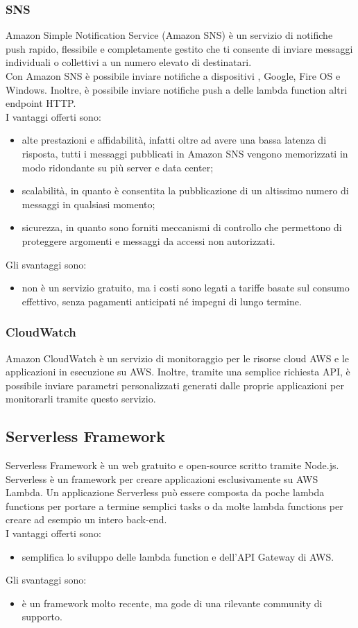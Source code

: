 \subsubsection{SNS}
Amazon Simple Notification Service (Amazon SNS) è un servizio di notifiche push rapido, flessibile e completamente gestito che ti consente di inviare messaggi individuali o collettivi a un numero elevato di destinatari. \\
Con Amazon SNS è possibile inviare notifiche a dispositivi , Google, Fire OS e Windows. Inoltre, è possibile inviare notifiche push a delle lambda function  altri endpoint HTTP. \\
I vantaggi offerti sono:
\begin{itemize}
	\item alte prestazioni e affidabilità, infatti oltre ad avere una bassa latenza di risposta, tutti i messaggi pubblicati in Amazon SNS vengono memorizzati in modo ridondante su più server e data center;
	\item scalabilità, in quanto è consentita la pubblicazione di un altissimo numero di messaggi in qualsiasi momento;
	\item sicurezza, in quanto sono forniti meccanismi di controllo che permettono di proteggere argomenti e messaggi da accessi non autorizzati.
\end{itemize}
Gli svantaggi sono:
\begin{itemize}
	\item non è un servizio gratuito, ma i costi sono legati a tariffe basate sul consumo effettivo, senza pagamenti anticipati né impegni di lungo termine.
\end{itemize}
\subsubsection{CloudWatch}
Amazon CloudWatch è un servizio di monitoraggio per le risorse cloud AWS e le applicazioni in esecuzione su AWS. Inoltre, tramite una semplice richiesta API, è possibile inviare parametri personalizzati generati dalle proprie applicazioni per monitorarli tramite questo servizio.
\subsection{Serverless Framework}
Serverless Framework è un web  gratuito e open-source scritto tramite Node.js. Serverless è un framework per creare applicazioni esclusivamente su AWS Lambda. Un applicazione Serverless può essere composta da poche lambda functions per portare a termine semplici tasks o da molte lambda functions per creare ad esempio un intero back-end.\\
I vantaggi offerti sono:
\begin{itemize}
	\item semplifica lo sviluppo delle lambda function e dell'API Gateway di AWS.
\end{itemize}
Gli svantaggi sono:
\begin{itemize}
	\item è un framework molto recente, ma gode di una rilevante community di supporto.
\end{itemize}
\newpage
